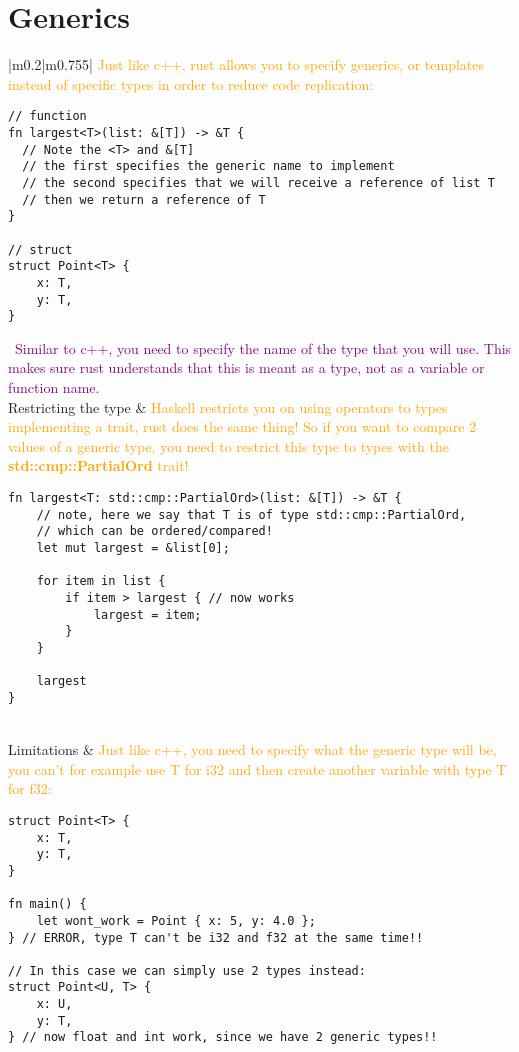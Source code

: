 \documentclass[main.tex,fontsize=8pt,paper=a4,paper=portrait,DIV=calc,]{scrartcl}
\begin{document}
\begin{table}[ht!]
\section{Generics}
\begin{tabular}{|m{0.2\linewidth}|m{0.755\linewidth}|}
\hline
\textcolor{orange}{Just like c++, rust allows you to specify generics, or templates instead of specific types in order to reduce code replication:}\newline
\begin{lstlisting}
// function
fn largest<T>(list: &[T]) -> &T {
  // Note the <T> and &[T]
  // the first specifies the generic name to implement
  // the second specifies that we will receive a reference of list T
  // then we return a reference of T
}

// struct
struct Point<T> {
    x: T,
    y: T,
}
\end{lstlisting}
\, \newline
\textcolor{purple}{Similar to c++, you need to specify the name of the type that you will use. This makes sure rust understands that this is meant as a type, not as a variable or function name.}\\
\hline
Restricting the type & 
\textcolor{orange}{Haskell restricts you on using operators to types implementing a trait, rust does the same thing! So if you want to compare 2 values of a generic type, you need to restrict this type to types with the \textbf{std::cmp::PartialOrd} trait!}\newline
\begin{lstlisting}
fn largest<T: std::cmp::PartialOrd>(list: &[T]) -> &T {
    // note, here we say that T is of type std::cmp::PartialOrd,
    // which can be ordered/compared!
    let mut largest = &list[0];

    for item in list {
        if item > largest { // now works
            largest = item;
        }
    }

    largest
}
\end{lstlisting}\\
\hline
Limitations & 
\textcolor{orange}{Just like c++, you need to specify what the generic type will be, you can't for example use T for i32 and then create another variable with type T for f32:}\newline
\begin{lstlisting}
struct Point<T> {
    x: T,
    y: T,
}

fn main() {
    let wont_work = Point { x: 5, y: 4.0 };
} // ERROR, type T can't be i32 and f32 at the same time!!

// In this case we can simply use 2 types instead:
struct Point<U, T> {
    x: U,
    y: T,
} // now float and int work, since we have 2 generic types!!
\end{lstlisting}\\
\hline

\hline

\hline

\hline

\hline
\end{tabular}
\end{table}
\end{document}
